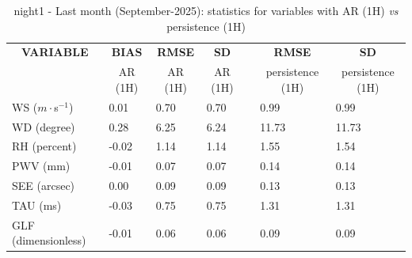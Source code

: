 \begin{table}[]
\begin{center}
\begin{tabular}{|l|l|l|l|l|l|l|}
\hline
\multicolumn{1}{|c|}{\cellcolor[HTML]{C0C0C0}\textbf{VARIABLE}} & \multicolumn{1}{c|}{\cellcolor[HTML]{C0C0C0}\textbf{BIAS}} & \multicolumn{1}{c|}{\cellcolor[HTML]{C0C0C0}\textbf{RMSE}} & \multicolumn{1}{c|}{\cellcolor[HTML]{C0C0C0}\textbf{SD}} & & \multicolumn{1}{c|}{\cellcolor[HTML]{C0C0C0}\textbf{RMSE}} & \multicolumn{1}{c|}{\cellcolor[HTML]{C0C0C0}\textbf{SD}}\\
\multicolumn{1}{|c|}{\cellcolor[HTML]{C0C0C0}} & \multicolumn{1}{c|}{\cellcolor[HTML]{C0C0C0}AR (1H)} & \multicolumn{1}{c|}{\cellcolor[HTML]{C0C0C0}AR (1H)} & \multicolumn{1}{c|}{\cellcolor[HTML]{C0C0C0}AR (1H)} & & \multicolumn{1}{c|}{\cellcolor[HTML]{C0C0C0}persistence (1H)} & \multicolumn{1}{c|}{\cellcolor[HTML]{C0C0C0}persistence (1H)}\\\hline
\cellcolor[HTML]{C0C0C0}WS ($m\cdot$s$^{-1}$) &      0.01  &      0.70  &      0.70  & &      0.99  &      0.99\\
\cellcolor[HTML]{C0C0C0}WD (degree)           &      0.28  &      6.25  &      6.24  & &     11.73  &     11.73\\
\cellcolor[HTML]{C0C0C0}RH (percent)          &     -0.02  &      1.14  &      1.14  & &      1.55  &      1.54\\
\cellcolor[HTML]{C0C0C0}PWV (mm)              &     -0.01 &      0.07 &      0.07 & &      0.14 &      0.14\\
\cellcolor[HTML]{C0C0C0}SEE (arcsec)          &      0.00 &      0.09 &      0.09 & &      0.13 &      0.13\\
\cellcolor[HTML]{C0C0C0}TAU (ms)              &     -0.03 &      0.75 &      0.75 & &      1.31 &      1.31\\
\cellcolor[HTML]{C0C0C0}GLF (dimensionless)   &     -0.01 &      0.06 &      0.06 & &      0.09 &      0.09\\
\hline
\end{tabular}
\caption{night1 - Last month (September-2025): statistics for variables with AR (1H) \textit{vs} persistence (1H)}\label{tab:night1:statAFT:LM}
\end{center}
\end{table}

